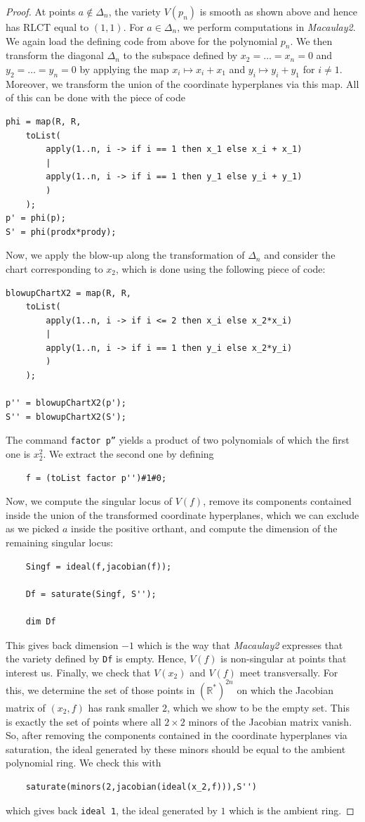 \documentclass[11pt]{amsart}
\numberwithin{equation}{section}
\theoremstyle{plain}
\theoremstyle{definition}
\newcommand{\R}{\mathbb{R}}
\begin{document}
\begin{proof}
    At points $a \notin \Delta_n$, the variety $V(p_n)$ is smooth as shown above and hence has RLCT equal to $(1,1)$. For $a \in \Delta_n$, we perform computations in \textit{Macaulay2}. We again load the defining code from above for the polynomial $p_n$. We then transform the diagonal $\Delta_n$ to the subspace defined by $x_2 = \ldots = x_n = 0$ and $y_2 = \ldots=y_n = 0$ by applying the map $x_i \mapsto x_i + x_1$ and $y_i \mapsto y_i + y_1$ for $i \neq 1$. Moreover, we transform the union of the coordinate hyperplanes via this map. All of this can be done with the piece of code
    \begin{verbatim}
phi = map(R, R,
    toList(
        apply(1..n, i -> if i == 1 then x_1 else x_i + x_1)
        |
        apply(1..n, i -> if i == 1 then y_1 else y_i + y_1)
        )
    );
p' = phi(p);
S' = phi(prodx*prody);
    \end{verbatim}
Now, we apply the blow-up along the transformation of $\Delta_n$ and consider the chart corresponding to $x_2$, which is done using the following piece of code:
\begin{verbatim}
blowupChartX2 = map(R, R,
    toList(
        apply(1..n, i -> if i <= 2 then x_i else x_2*x_i)
        |
        apply(1..n, i -> if i == 1 then y_i else x_2*y_i)
        )
    );

p'' = blowupChartX2(p');
S'' = blowupChartX2(S');
\end{verbatim}
The command \texttt{factor p''} yields a product of two polynomials of which the first one is $x_2^2$. We extract the second one by defining
\begin{verbatim}
    f = (toList factor p'')#1#0;
\end{verbatim}
Now, we compute the singular locus of $V(f)$, remove its components contained inside the union of the transformed coordinate hyperplanes, which we can exclude as we picked $a$ inside the positive orthant, and compute the dimension of the remaining singular locus:
\begin{verbatim}
    Singf = ideal(f,jacobian(f));

    Df = saturate(Singf, S'');

    dim Df
\end{verbatim}
This gives back dimension $-1$ which is the way that \emph{Macaulay2} expresses that the variety defined by \texttt{Df} is empty. Hence, $V(f)$ is non-singular at points that interest us. Finally, we check that $V(x_2)$ and $V(f)$ meet transversally. For this, we determine the set of those points in $(\R^*)^{2n}$ on which the Jacobian matrix of $(x_2,f)$ has rank smaller $2$, which we show to be the empty set. This is exactly the set of points where all $2\times 2$ minors of the Jacobian matrix vanish. So, after removing the components contained in the coordinate hyperplanes via saturation, the ideal generated by these minors should be equal to the ambient polynomial ring. We check this with
\begin{verbatim}
    saturate(minors(2,jacobian(ideal(x_2,f))),S'')
\end{verbatim}
which gives back \texttt{ideal 1}, the ideal generated by $1$ which is the ambient ring.


\end{proof}
\end{document}
